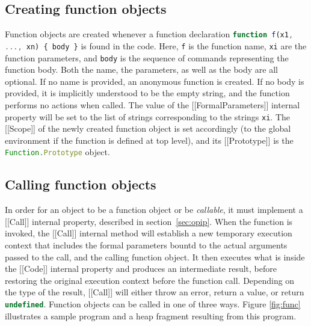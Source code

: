 \documentclass[a4paper,11pt,twoside]{report}
\def\jsinline{\lstinline[language=JavaScript, basicstyle=\small]}%\end{lstlisting}
\begin{document}
\subsection{Creating function objects}
Function objects are created whenever a function declaration \jsinline|function f(x1, ..., xn) { body }| is found in the code. 
Here, \jsinline|f| is the function name, \jsinline|xi| are the function parameters, and \jsinline|body| is the sequence of commands
representing the function body. Both the name, the parameters, as well as the body are all optional. If no name is provided,
an anonymous function is created. If no body is provided,
it is implicitly understood to be the empty string, and the function performs no actions when called.
The value of the [[FormalParameters]] internal property will be set to the list of strings corresponding to the strings \jsinline|xi|. 
The [[Scope]] of the newly created function object is set accordingly (to the global environment if the function is defined at top level), 
and its [[Prototype]] is the \jsinline|Function.Prototype| object.

\subsection{Calling function objects}
In order for an object to be a function object or be \emph{callable}, it must implement a [[Call]] internal property, described in section~\ref{sec:opip}. When the function is invoked, the [[Call]] internal method will establish a new temporary execution context that includes the formal parameters bountd to the actual arguments passed to the call, and the calling function object. It then executes what is inside the [[Code]] internal property and produces an intermediate result, before restoring the original execution context before the function call. Depending on the type of the result, [[Call]] will either throw an error, return a value, or return \jsinline|undefined|. Function objects can be called in one of three ways. Figure \ref{fig:func} illustrates a sample program and a heap fragment resulting from this program.
\end{document}
